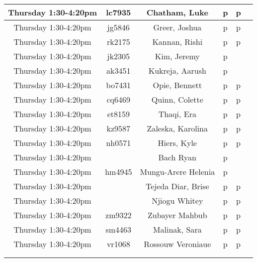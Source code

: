\documentclass[letterpaper]{article}
\begin{document}
\begin{longtable}{|c|c|c|c|c|c|}
\hline
Thursday 1:30-4:20pm & lc7935 & Chatham, Luke & p & p  &  \\
\hline
Thursday 1:30-4:20pm & jg5846 & Greer, Joshua & p & p  &  \\
\hline
Thursday 1:30-4:20pm & rk2175 & Kannan, Rishi & p & p  &  \\
\hline
Thursday 1:30-4:20pm & jk2305 & Kim, Jeremy & p  & & \\
\hline
Thursday 1:30-4:20pm & ak3451 & Kukreja, Aarush & p & & \\
\hline
Thursday 1:30-4:20pm & bo7431 & Opie, Bennett & p & p  &  \\
\hline
Thursday 1:30-4:20pm & cq6469 & Quinn, Colette & p & p  &  \\
\hline
Thursday 1:30-4:20pm & et8159 & Thaqi, Era & p & p  &  \\
\hline
Thursday 1:30-4:20pm & kz9587 & Zaleska, Karolina & p & p  &  \\
\hline
Thursday 1:30-4:20pm & nh0571 & Hiers, Kyle & p & p  &  \\
\hline
Thursday 1:30-4:20pm & & Bach Ryan & p  & & \\
\hline
Thursday 1:30-4:20pm & hm4945 & Mungu-Arere Helenia & p  & & \\
\hline
Thursday 1:30-4:20pm & & Tejeda Diar, Brise & p & p  &  \\
\hline
Thursday 1:30-4:20pm & & Njiogu Whitey & p & p  &  \\
\hline
Thursday 1:30-4:20pm & zm9322 & Zubayer Mahbub & p & p  &  \\
\hline
Thursday 1:30-4:20pm & sm4463 & Malinak, Sara & p & p  &  \\
\hline
Thursday 1:30-4:20pm & vr1068 & Rossouw Veroniaue & p & p  &  \\
\hline
& & & & & \\
\hline
& & & & & \\
\hline
\end{longtable}

% 
% 
\end{document}
